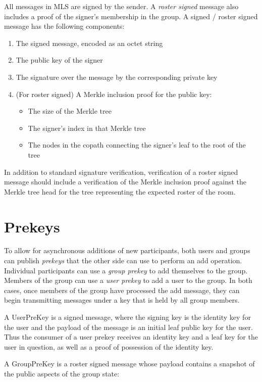 \documentclass[11pt, oneside]{article}
\begin{document}
All messages in MLS are signed by the sender.  A \textit{roster signed} message also includes a proof of the signer's membership in the group.  A signed / roster signed message has the following components:

\begin{enumerate}
\item{The signed message, encoded as an octet string}
\item{The public key of the signer}
\item{The signature over the message by the corresponding private key}
\item{(For roster signed) A Merkle inclusion proof for the public key:
\begin{itemize}
\item{The size of the Merkle tree}
\item{The signer's index in that Merkle tree}
\item{The nodes in the copath connecting the signer's leaf to the root of the tree}
\end{itemize}
}
\end{enumerate}

In addition to standard signature verification, verification of a roster signed message should include a verification of the Merkle inclusion proof against the Merkle tree head for the tree representing the expected roster of the room.


\section{Prekeys}

To allow for asynchronous additions of new participants, both users and groups can publish \textit{prekeys} that the other side can use to perform an add operation.  Individual participants can use a \textit{group prekey} to add themselves to the group.  Members of the group can use a \textit{user prekey} to add a user to the group.  In both cases, once members of the group have processed the add message, they can begin transmitting messages under a key that is held by all group members.

A UserPreKey is a signed message, where the signing key is the identity key for the user and the payload of the message is an initial leaf public key for the user.  Thus the consumer of a user prekey receives an identity key and a leaf key for the user in question, as well as a proof of possession of the identity key.

A GroupPreKey is a roster signed message whose payload contains a snapshot of the public aspects of the group state:
\end{document}
